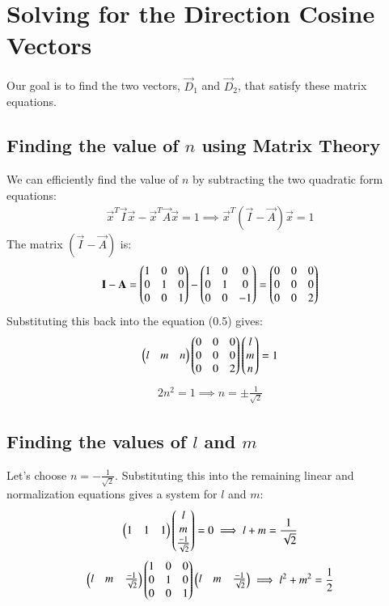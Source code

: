 \documentclass[journal]{IEEEtran}
\begin{document}
\section{Solving for the Direction Cosine Vectors}

Our goal is to find the two vectors, $\vec{D}_1$ and $\vec{D}_2$, that satisfy these matrix equations.

\subsection{Finding the value of $n$ using Matrix Theory}
We can efficiently find the value of $n$ by subtracting the two quadratic form equations:
\begin{align}
\vec{x}^T \vec{I} \vec{x} - \vec{x}^T \vec{A} \vec{x} = 1 \implies \vec{x}^T (\vec{I} - \vec{A}) \vec{x} = 1
\end{align}
The matrix $(\vec{I} - \vec{A})$ is:
\begin{align}
\mathbf{I} - \mathbf{A} = \begin{pmatrix} 1 & 0 & 0 \\ 0 & 1 & 0 \\ 0 & 0 & 1 \end{pmatrix} -\begin{pmatrix} 1 & 0 & 0 \\ 0 & 1 & 0 \\ 0 & 0 & -1 \end{pmatrix} = \begin{pmatrix} 0 & 0 & 0 \\ 0 & 0 & 0 \\ 0 & 0 & 2 \end{pmatrix}
\end{align}
Substituting this back into the equation (0.5) gives:
\begin{align}
\begin{pmatrix} l & m & n \end{pmatrix} \begin{pmatrix} 0 & 0 & 0 \\ 0 & 0 & 0 \\ 0 & 0 & 2\end{pmatrix} \begin{pmatrix} l \\ m \\ n\end{pmatrix} = 1
\end{align}
\begin{align}
2n^2 = 1 \implies n = \pm \frac{1}{\sqrt{2}}
\end{align}

\subsection{Finding the values of $l$ and $m$}
Let's choose $n = -\frac{1}{\sqrt{2}}$. Substituting this into the remaining linear and normalization equations gives a system for $l$ and $m$:
\begin{align}
     \begin{pmatrix}1&1&1\end{pmatrix}\begin{pmatrix}l\\ m \\ \frac{-1}{\sqrt{2}}\end{pmatrix}=0 \implies l+m=\frac{1}{\sqrt{2}}
     \end{align}
     \begin{align}
     \begin{pmatrix}l &m &\frac{-1}{\sqrt{2}}\end{pmatrix}\begin{pmatrix} 1 & 0 & 0 \\ 0 & 1 & 0 \\ 0 & 0 & 1 \end{pmatrix}\begin{pmatrix}l &m &\frac{-1}{\sqrt{2}}\end{pmatrix} \implies l^2 + m^2 = \frac{1}{2}
     \end{align}
     
\end{document}
